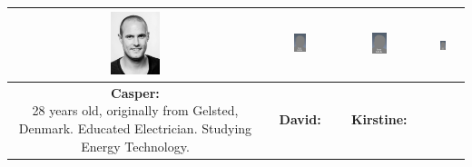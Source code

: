 \begin{table}[h]
\centering
\begin{tabular}{|c|c|c|c|}
\hline
\includegraphics[width=0.2\textwidth]{graphics/cgopic} & %
\includegraphics[width=0.2\textwidth]{graphics/AnonProfile} & %
\includegraphics[width=0.2\textwidth]{graphics/AnonProfile} & %
\includegraphics[width=0.2\textwidth]{graphics/AnonProfile} \\ \hline %
\parbox[t] {0.2\textwidth}{
\textbf{Casper:} \\
28 years old, originally from Gelsted, Denmark. Educated Electrician. Studying Energy Technology.
}

&

\parbox[t] {0.2\textwidth}{
\textbf{David:} \\

} 

&

\parbox[t] {0.2\textwidth}{
\textbf{Kirstine:} \\

}
\end{tabular}
\end{table}
